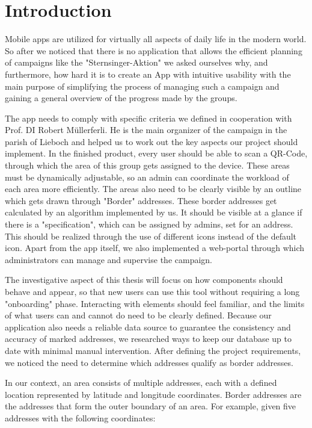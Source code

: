 \section{Introduction}

Mobile apps are utilized for virtually all aspects of daily life in the modern world. So after we noticed that there is no application that allows the efficient planning of campaigns like the "Sternsinger-Aktion" we asked ourselves why, and furthermore, how hard it is to create an App with intuitive usability with the main purpose of simplifying the process of managing such a campaign and gaining a general overview of the progress made by the groups.

\blankLine

The app needs to comply with specific criteria we defined in cooperation with Prof. DI Robert Müllerferli. He is the main organizer of the campaign in the parish of Lieboch and helped us to work out the key aspects our project should implement. In the finished product, every user should be able to scan a QR-Code, through which the area of this group gets assigned to the device. These areas must be dynamically adjustable, so an admin can coordinate the workload of each area more efficiently. The areas also need to be clearly visible by an outline which gets drawn through "Border" addresses. These border addresses get calculated by an algorithm implemented by us. It should be visible at a glance if there is a "specification", which can be assigned by admins, set for an address. This should be realized through the use of different icons instead of the default icon. Apart from the app itself, we also implemented a web-portal through which administrators can manage and supervise the campaign. 

\blankLine

The investigative aspect of this thesis will focus on how components should behave and appear, so that new users can use this tool without requiring a long "onboarding" phase. Interacting with elements should feel familiar, and the limits of what users can and cannot do need to be clearly defined. Because our application also needs a reliable data source to guarantee the consistency and accuracy of marked addresses, we researched ways to keep our database up to date with minimal manual intervention. After defining the project requirements, we noticed the need to determine which addresses qualify as border addresses.

In our context, an area consists of multiple addresses, each with a defined location represented by latitude and longitude coordinates. Border addresses are the addresses that form the outer boundary of an area. For example, given five addresses with the following coordinates:


